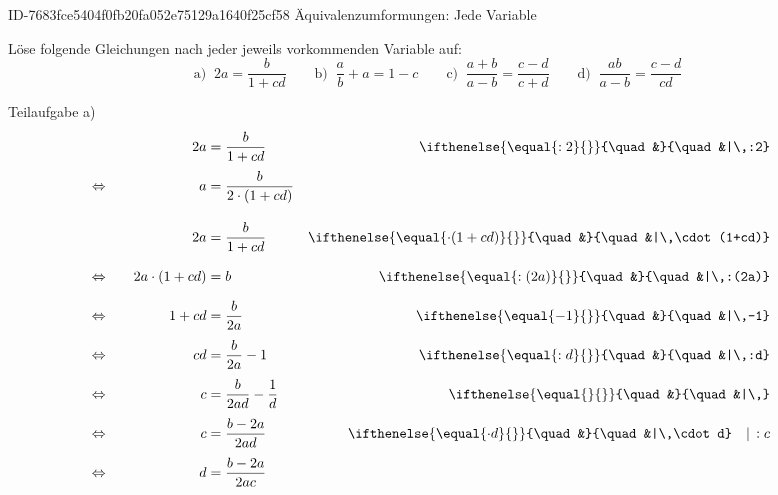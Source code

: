 \begin{exercise}
      {ID-7683fce5404f0fb20fa052e75129a1640f25cf58}
      {Äquivalenzumformungen: Jede Variable}
  \ifproblem\problem\par
    Löse folgende Gleichungen nach jeder jeweils vorkommenden Variable auf:
    \begin{equation*}
      \text{a)}\;\;
      2a=\frac{b}{1+cd}
      \quad
      \quad
      \text{b)}\;\;
      \frac{a}{b}+a=1-c
      \quad
      \quad
      \text{c)}\;\;
      \frac{a+b}{a-b}=\frac{c-d}{c+d}
      \quad
      \quad
      \text{d)}\;\;
      \frac{ab}{a-b}=\frac{c-d}{cd}
    \end{equation*}
  \fi
  \ifoutcome\outcome\par
    \begingroup
      \newcommand{\vstrut}{\vphantom{\left(\frac{h}{q}\right)}}%
      \newcommand{\equi}{\Leftrightarrow&\vstrut\quad}%
      \newcommand{\calc}[1]
      {%
        \ifthenelse{\equal{#1}{}}%
        {%
          \quad&%
        }%
        {%
          \quad&|\,#1%
        }%
      }%
      \newcommand{\ccalc}[2]%
      {%
        \calc{#1}\quad|\,#2%
      }%
      Teilaufgabe a)
      \begin{alignat*}{3}
        \relax&\vstrut\quad
        &
        2a&=\frac{b}{1+cd}
        &
        \calc{:2}
        \\
        \equi
        &
        a&=\frac{b}{2\cdot(1+cd)}
        &
        \quad&\relax
        \\[2ex]
        \relax&\vstrut\quad
        &
        2a&=\frac{b}{1+cd}
        &
        \calc{\cdot(1+cd)}
        \\
        \equi
        &
        2a\cdot(1+cd)&=b
        &
        \calc{:(2a)}
        \\
        \equi
        &
        1+cd&=\frac{b}{2a}
        &
        \calc{-1}
        \\
        \equi
        &
        cd&=\frac{b}{2a}-1
        &
        \calc{:d}
        \\
        \equi
        &
        c&=\frac{b}{2ad}-\frac{1}{d}
        &
        \calc{}
        \\
        \equi
        &
        c&=\frac{b-2a}{2ad}
        &
        \ccalc{\cdot d}{:c}
        \\
        \equi
        &
        d&=\frac{b-2a}{2ac}

\end{alignat*}
\end{exercise}

